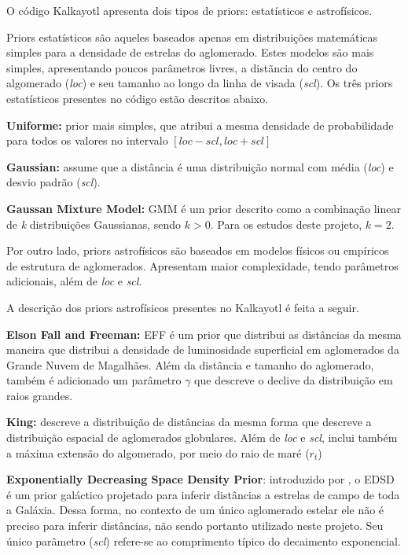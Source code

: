 \documentclass[12pt]{projeto}
\begin{document}
O código Kalkayotl apresenta dois tipos de priors: estatísticos e astrofísicos.

Priors estatísticos são aqueles baseados apenas em distribuições matemáticas simples para a densidade de estrelas do aglomerado. Estes modelos são mais simples, apresentando poucos parâmetros livres, a distãncia do centro do algomerado (\textit{loc}) e seu tamanho ao longo da linha de visada (\textit{scl}). Os três priors estatísticos presentes no código estão descritos abaixo.

\textbf{Uniforme:} prior mais simples, que atribui a mesma densidade de probabilidade para todos os valores no intervalo \([loc-scl,loc+scl]\)  

\textbf{Gaussian:} assume que a distância é uma distribuição normal com média (\textit{loc}) e desvio padrão (\textit{scl}).

\textbf{Gaussan Mixture Model:} GMM é um prior descrito como a combinação linear de \textit{k} distribuições Gaussianas, sendo \(k>0\). Para os estudos deste projeto, \(k=2\).

Por outro lado, priors astrofísicos  são baseados em modelos físicos ou empíricos de estrutura de aglomerados. Apresentam maior complexidade, tendo parâmetros adicionais, além de \textit{loc} e \textit{scl}.

A descrição dos priors astrofísicos presentes no Kalkayotl é feita a seguir.

\textbf{Elson Fall and Freeman:} EFF é um prior que distribui as distâncias da mesma maneira que \cite{elson_structure_1987} distribui a densidade de luminosidade superficial em aglomerados da Grande Nuvem de Magalhães. Além da distância e tamanho do aglomerado, também é adicionado um parâmetro \(\gamma\) que descreve o declive da distribuição em raios grandes.

\textbf{King:} descreve a distribuição de distâncias da mesma forma que \cite{king_structure_1962} descreve a distribuição espacial de aglomerados globulares. Além de \textit{loc} e \textit{scl}, inclui também a máxima extensão do algomerado, por meio do raio de maré (\(r_t\))

\textbf{Exponentially Decreasing Space Density Prior}: introduzido por \cite{bailer-jones_estimating_2015}, o EDSD é um prior galáctico projetado para inferir distâncias a estrelas de campo de toda a Galáxia. Dessa forma, no contexto de um único aglomerado estelar ele não é preciso para inferir distâncias, não sendo portanto utilizado neste projeto. Seu único parâmetro (\textit{scl}) refere-se ao comprimento típico do decaimento exponencial.
\end{document}
